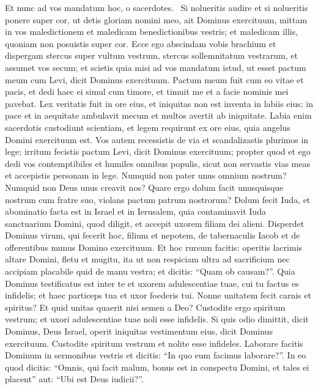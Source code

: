 \begin{biblechapter}  
\verse Et nunc ad vos mandatum hoc, o sacerdotes.  
\verse Si nolueritis audire et si nolueritis ponere super cor, ut detis gloriam nomini meo, ait Dominus exercituum, mittam in vos maledictionem et maledicam benedictionibus vestris; et maledicam illis, quoniam non posuistis super cor. 
\verse Ecce ego abscindam vobis brachium et dispergam stercus super vultum vestrum, stercus sollemnitatum vestrarum, et assumet vos secum; 
\verse et scietis quia misi ad vos mandatum istud, ut esset pactum meum cum Levi, dicit Dominus exercituum. 
\verse Pactum meum fuit cum eo vitae et pacis, et dedi haec ei simul cum timore, et timuit me et a facie nominis mei pavebat. 
\verse Lex veritatis fuit in ore eius, et iniquitas non est inventa in labiis eius; in pace et in aequitate ambulavit mecum et multos avertit ab iniquitate. 
\verse Labia enim sacerdotis custodiunt scientiam, et legem requirunt ex ore eius, quia angelus Domini exercituum est. 
\verse Vos autem recessistis de via et scandalizastis plurimos in lege; irritum fecistis pactum Levi, dicit Dominus exercituum; 
\verse propter quod et ego dedi vos contemptibiles et humiles omnibus populis, sicut non servastis vias meas et accepistis personam in lege. 
\verse Numquid non pater unus omnium nostrum? Numquid non Deus unus creavit nos? Quare ergo dolum facit unusquisque nostrum cum fratre suo, violans pactum patrum nostrorum? 
\verse Dolum fecit Iuda, et abominatio facta est in Israel et in Ierusalem, quia contaminavit Iuda sanctuarium Domini, quod diligit, et accepit uxorem filiam dei alieni. 
\verse Disperdet Dominus virum, qui fecerit hoc, filium et nepotem, de tabernaculis Iacob et de offerentibus munus Domino exercituum. 
\verse Et hoc rursum facitis: operitis lacrimis altare Domini, fletu et mugitu, ita ut non respiciam ultra ad sacrificium nec accipiam placabile quid de manu vestra; 
\verse et dicitis: “Quam ob causam?”. Quia Dominus testificatus est inter te et uxorem adulescentiae tuae, cui tu factus es infidelis; et haec particeps tua et uxor foederis tui. 
\verse Nonne unitatem fecit carnis et spiritus? Et quid unitas quaerit nisi semen a Deo? Custodite ergo spiritum vestrum; et uxori adulescentiae tuae noli esse infidelis. 
\verse Si quis odio dimittit, dicit Dominus, Deus Israel, operit iniquitas vestimentum eius, dicit Dominus exercituum. Custodite spiritum vestrum et nolite esse infideles. 
\verse Laborare facitis Dominum in sermonibus vestris et dicitis: “In quo eum facimus laborare?”. In eo quod dicitis: “Omnis, qui facit malum, bonus est in conspectu Domini, et tales ei placent” aut: “Ubi est Deus iudicii?”. 
\end{biblechapter}

